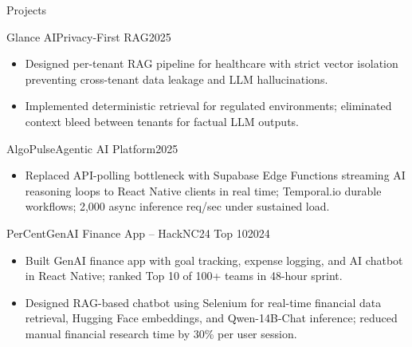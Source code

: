 \documentclass[]{mcdowellcv}
\begin{document}
\begin{cvsection}{Projects}
  \begin{cvsubsection}{Glance AI}{Privacy-First RAG}{2025}
    \begin{itemize}
      \item Designed per-tenant RAG pipeline for healthcare with strict vector isolation preventing cross-tenant data leakage and LLM hallucinations.
      \item Implemented deterministic retrieval for regulated environments; eliminated context bleed between tenants for factual LLM outputs.
    \end{itemize}
    \vspace{-1.5pt}
  \end{cvsubsection}

  \begin{cvsubsection}{AlgoPulse}{Agentic AI Platform}{2025}
    \begin{itemize}
      \item Replaced API-polling bottleneck with Supabase Edge Functions streaming AI reasoning loops to React Native clients in real time; Temporal.io durable workflows; 2,000 async inference req/sec under sustained load.
    \end{itemize}
    \vspace{-1.5pt}
  \end{cvsubsection}

  \begin{cvsubsection}{PerCent}{GenAI Finance App -- HackNC24 Top 10}{2024}
    \begin{itemize}
      \item Built GenAI finance app with goal tracking, expense logging, and AI chatbot in React Native; ranked Top 10 of 100+ teams in 48-hour sprint.
      \item Designed RAG-based chatbot using Selenium for real-time financial data retrieval, Hugging Face embeddings, and Qwen-14B-Chat inference; reduced manual financial research time by 30\% per user session.
    \end{itemize}
    \vspace{-1.5pt}
  \end{cvsubsection}

\end{cvsection}
\end{document}
